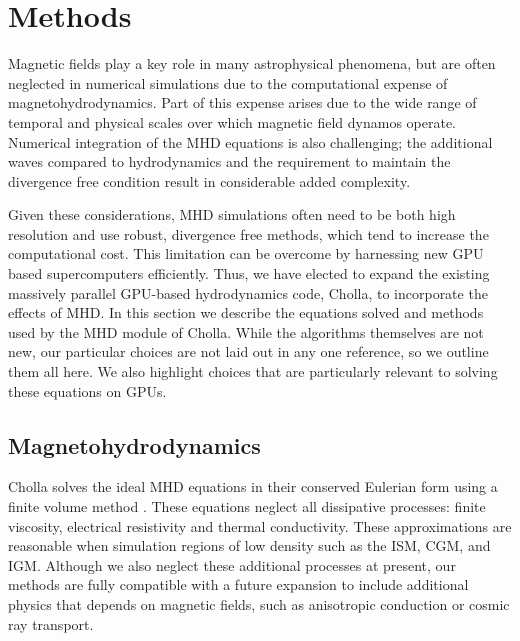 
\section{Methods}
\label{sec:methods}

Magnetic fields play a key role in many astrophysical phenomena, but are often neglected in numerical simulations due to the computational expense of magnetohydrodynamics. Part of this expense arises due to the wide range of temporal and physical scales over which magnetic field dynamos operate. Numerical integration of the MHD equations is also challenging; the additional waves compared to hydrodynamics and the requirement to maintain the divergence free condition result in considerable added complexity.

Given these considerations, MHD simulations often need to be both high resolution and use robust, divergence free methods, which tend to increase the computational cost. This limitation can be overcome by harnessing new GPU based supercomputers efficiently. Thus, we have elected to expand the existing massively parallel GPU-based hydrodynamics code, Cholla, to incorporate the effects of MHD. In this section we describe the equations solved and methods used by the MHD module of Cholla. While the algorithms themselves are not new, our particular choices are not laid out in any one reference, so we outline them all here. We also highlight choices that are particularly relevant to solving these equations on GPUs.

\subsection{Magnetohydrodynamics}
\label{sec:methods-mhd}

Cholla solves the ideal MHD equations in their conserved Eulerian form using a finite volume method \citep{Godunov}. These equations neglect all dissipative processes: finite viscosity, electrical resistivity and thermal conductivity. These approximations are reasonable when simulation regions of low density such as the ISM, CGM, and IGM. Although we also neglect these additional processes at present, our methods are fully compatible with a future expansion to include additional physics that depends on magnetic fields, such as anisotropic conduction or cosmic ray transport.

